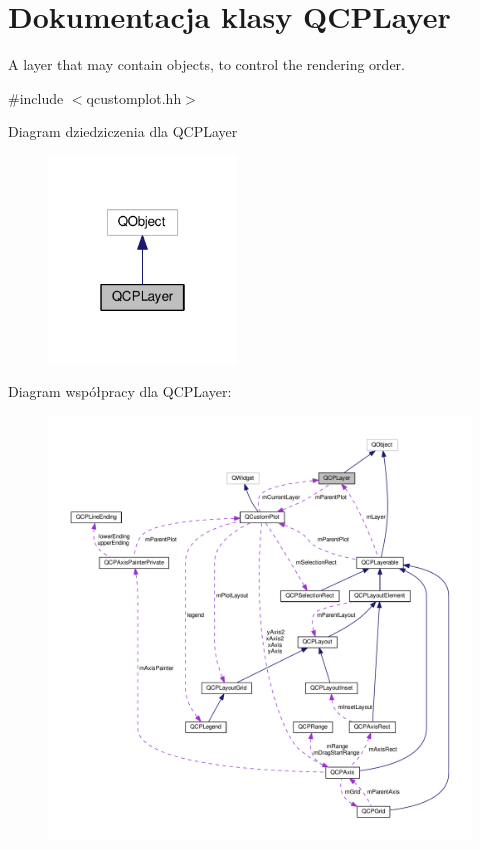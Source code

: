 \hypertarget{class_q_c_p_layer}{}\section{Dokumentacja klasy Q\+C\+P\+Layer}
\label{class_q_c_p_layer}


A layer that may contain objects, to control the rendering order.  




{\ttfamily \#include $<$qcustomplot.\+hh$>$}



Diagram dziedziczenia dla Q\+C\+P\+Layer\nopagebreak
\begin{figure}[H]
\begin{center}
\leavevmode
\includegraphics[width=142pt]{class_q_c_p_layer__inherit__graph}
\end{center}
\end{figure}


Diagram współpracy dla Q\+C\+P\+Layer\+:\nopagebreak
\begin{figure}[H]
\begin{center}
\leavevmode
\includegraphics[width=350pt]{class_q_c_p_layer__coll__graph}
\end{center}
\end{figure}
